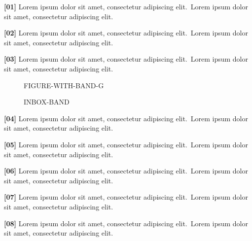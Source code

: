 \documentclass[twocolumn]{article}
\newcommand\Body{Lorem ipsum dolor sit amet, consectetur adipiscing elit.}
\newcommand\Par[1]{\par\textbf{[#1]} \Body\ \Body\par\medskip}
\begin{document}
\Par{01}\Par{02}\Par{03}
\begin{figure}[h]
  \centering FIGURE-WITH-BAND-G
  \begin{wideband}\centering INBOX-BAND\end{wideband}
\end{figure}
\Par{04}\Par{05}\Par{06}\Par{07}\Par{08}
\end{document}
